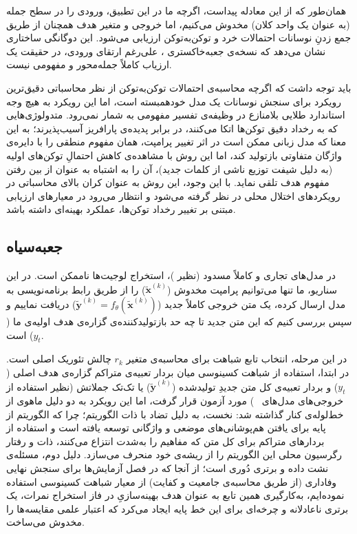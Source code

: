 همان‌طور که از این معادله پیداست، اگرچه ما در این تطبیق، ورودی را در سطح جمله (به عنوان یک واحد کلان) مخدوش می‌کنیم، اما خروجی و متغیر هدف همچنان از طریق جمع زدنِ نوسانات احتمالات خرد و توکن‌به‌توکن ارزیابی می‌شود. این دوگانگی ساختاری نشان می‌دهد که نسخه‌ی جعبه‌خاکستری ، علی‌رغم ارتقای ورودی، در حقیقت یک ارزیاب کاملاً جمله‌محور و مفهومی نیست.

باید توجه داشت که اگرچه محاسبه‌ی احتمالات توکن‌به‌توکن از نظر محاسباتی دقیق‌ترین رویکرد برای سنجش نوسانات یک مدل خودهمبسته است، اما این رویکرد به هیچ وجه استاندارد طلایی بلامنازع در وظیفه‌ی تفسیر مفهومی به شمار نمی‌رود. متدولوژی‌هایی که به رخداد دقیق توکن‌ها اتکا می‌کنند، در برابر پدیده‌ی پارافریز آسیب‌پذیرند؛ به این معنا که مدل زبانی ممکن است در اثر تغییر پرامپت، همان مفهوم منطقی را با دایره‌ی واژگان متفاوتی بازتولید کند، اما این روش با مشاهده‌ی کاهش احتمالِ توکن‌های اولیه (به دلیل شیفت توزیع ناشی از کلمات جدید)، آن را به اشتباه به عنوان از بین رفتن مفهوم هدف تلقی نماید. با این وجود، این روش به عنوان کران بالای محاسباتی در رویکردهای اختلال محلی در نظر گرفته می‌شود و انتظار می‌رود در معیارهای ارزیابی مبتنی بر تغییر رخداد توکن‌ها، عملکرد بهینه‌ای داشته باشد.


\subsection{ جعبه‌سیاه}\label{app:lime_blackbox}

در مدل‌های تجاری و کاملاً مسدود (نظیر )، استخراج لوجیت‌ها ناممکن است. در این سناریو، ما تنها می‌توانیم پرامپت مخدوش ($\tilde{\mathbf{x}}^{(k)}$) را از طریق رابط برنامه‌نویسی به مدل ارسال کرده، یک متن خروجی کاملاً جدید ($\tilde{\mathbf{y}}^{(k)} = f_\theta(\tilde{\mathbf{x}}^{(k)})$) دریافت نماییم و سپس بررسی کنیم که این متن جدید تا چه حد بازتولیدکننده‌ی گزاره‌ی هدف اولیه‌ی ما ($y_t$) است.

در این مرحله، انتخاب تابع شباهت برای محاسبه‌ی متغیر $r_k$ چالش تئوریک اصلی است. در ابتدا، استفاده از شباهت کسینوسی میان بردار تعبیه‌ی متراکم گزاره‌ی هدف اصلی ($y_t$) و بردار تعبیه‌ی کل متن جدیدِ تولیدشده ($\tilde{\mathbf{y}}^{(k)}$) یا تک‌تک جملاتش (نظیر استفاده از خروجی‌های مدل‌های ~\cite{reimers2019sentencebert}) مورد آزمون قرار گرفت، اما این رویکرد به دو دلیل ماهوی از خط‌لوله‌ی  کنار گذاشته شد:
نخست، به دلیل تضاد با ذات الگوریتم؛ چرا که الگوریتم  از پایه برای یافتن هم‌پوشانی‌های موضعی و واژگانی توسعه یافته است و استفاده از بردارهای متراکم برای کل متن که مفاهیم را به‌شدت انتزاع می‌کنند، ذات و رفتار رگرسیون محلی این الگوریتم را از ریشه‌ی خود منحرف می‌سازد.
دلیل دوم، مسئله‌ی نشت داده و برتری دُوری است؛ از آنجا که در فصل آزمایش‌ها برای سنجش نهایی وفاداری (از طریق محاسبه‌ی جامعیت و کفایت) از معیار شباهت کسینوسی استفاده نموده‌ایم، به‌کارگیری همین تابع به عنوان هدف بهینه‌سازیِ  در فاز استخراج نمرات، یک برتری ناعادلانه و چرخه‌ای برای این خط پایه ایجاد می‌کرد که اعتبار علمی مقایسه‌ها را مخدوش می‌ساخت.

